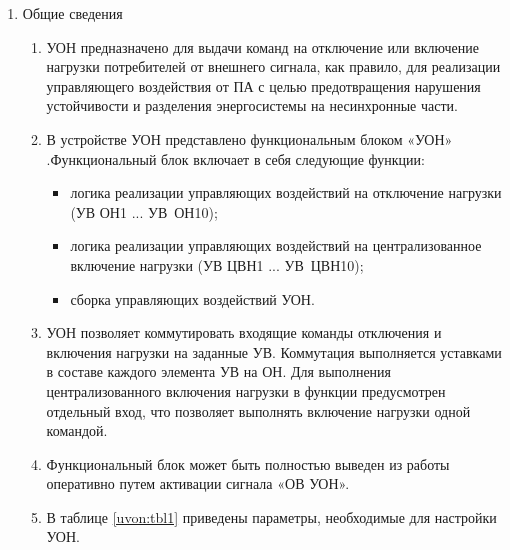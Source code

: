 
\color{black}

\begin{enumerate}

\item Общие сведения

\begin{enumerate}

\item
УОН предназначено для выдачи команд на отключение или включение нагрузки потребителей от внешнего сигнала, как правило, для реализации управляющего воздействия от ПА с целью предотвращения нарушения устойчивости и разделения энергосистемы на несинхронные части.

\item 
В устройстве УОН представлено функциональным блоком «УОН» .Функциональный блок включает в себя следующие функции:
\begin{itemize}
    \item логика реализации управляющих воздействий на отключение нагрузки (УВ ОН1 ... УВ~ОН10);
    \item логика реализации управляющих воздействий на централизованное включение нагрузки (УВ ЦВН1 ... УВ~ЦВН10);
    \item сборка управляющих воздействий УОН.   
\end{itemize}

\item
УОН позволяет коммутировать входящие команды отключения и включения нагрузки на заданные УВ. Коммутация выполняется уставками в составе каждого элемента УВ на ОН. Для выполнения централизованного включения нагрузки в функции предусмотрен отдельный вход, что позволяет выполнять включение нагрузки одной командой.

\item
Функциональный блок может быть полностью выведен из работы оперативно путем активации сигнала «ОВ УОН».
\item
В таблице \ref{uvon:tbl1} приведены параметры, необходимые для настройки УОН.

\end{enumerate}



\end{enumerate}
